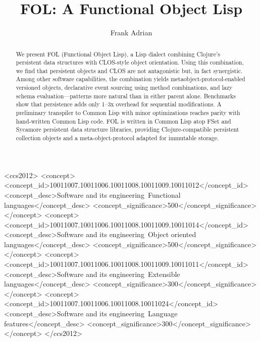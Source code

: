 \documentclass[sigconf,nonacm,review]{acmart}
\begin{document}
\title{FOL: A Functional Object Lisp}

\author{Frank Adrian}

\begin{abstract}
We present FOL (Functional Object Lisp), a Lisp dialect combining Clojure's persistent data structures with CLOS-style object orientation. Using this combination, we find that persistent objects and CLOS are not antagonistic but, in fact synergistic. Among other software capabilities, the combination yields metaobject-protocol-enabled versioned objects, declarative event sourcing using method combinations, and lazy schema evaluation---patterns more natural than in either parent alone. Benchmarks show that persistence adds only 1--3x overhead for sequential modifications. A preliminary transpiler to Common Lisp with minor optimizations reaches parity with hand-written Common Lisp code. FOL is written in Common Lisp atop FSet and Sycamore persistent data structure libraries, providing Clojure-compatible persistent collection objects and a meta-object-protocol adapted for immutable storage.
\end{abstract}

\begin{CCSXML}
<ccs2012>
   <concept>
       <concept_id>10011007.10011006.10011008.10011009.10011012</concept_id>
       <concept_desc>Software and its engineering~Functional languages</concept_desc>
       <concept_significance>500</concept_significance>
   </concept>
   <concept>
       <concept_id>10011007.10011006.10011008.10011009.10011014</concept_id>
       <concept_desc>Software and its engineering~Object oriented languages</concept_desc>
       <concept_significance>500</concept_significance>
   </concept>
   <concept>
       <concept_id>10011007.10011006.10011008.10011009.10011011</concept_id>
       <concept_desc>Software and its engineering~Extensible languages</concept_desc>
       <concept_significance>300</concept_significance>
   </concept>
   <concept>
       <concept_id>10011007.10011006.10011008.10011024</concept_id>
       <concept_desc>Software and its engineering~Language features</concept_desc>
       <concept_significance>300</concept_significance>
   </concept>
</ccs2012>
\end{CCSXML}

\end{document}
